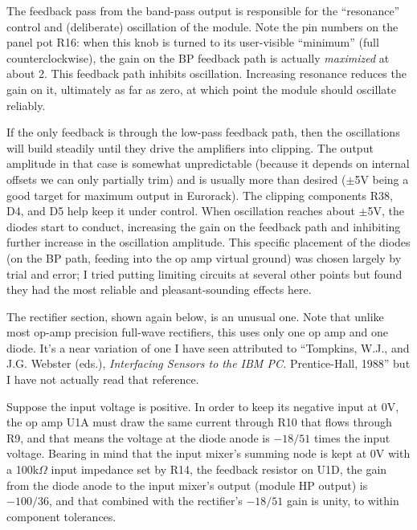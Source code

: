 The feedback pass from the band-pass output is responsible for the
``resonance'' control and (deliberate) oscillation of the module.  Note the
pin numbers on the panel pot R16: when this knob is turned to its
user-visible ``minimum'' (full counterclockwise), the gain on the BP
feedback path is actually \emph{maximized} at about 2.  This feedback path
inhibits oscillation.  Increasing resonance reduces the gain on it,
ultimately as far as zero, at which point the module should oscillate
reliably.

If the only feedback is through the low-pass feedback path, then the
oscillations will build steadily until they drive the amplifiers into
clipping.  The output amplitude in that case is somewhat unpredictable
(because it depends on internal offsets we can only partially trim) and is
usually more than desired ($\pm$5V being a good target for maximum output in
Eurorack).  The clipping components R38, D4, and D5 help keep it under
control.  When oscillation reaches about $\pm$5V, the diodes start to
conduct, increasing the gain on the feedback path and inhibiting further
increase in the oscillation amplitude.  This specific placement of the
diodes (on the BP path, feeding into the op amp virtual ground) was chosen
largely by trial and error; I tried putting limiting circuits at several
other points but found they had the most reliable and pleasant-sounding
effects here.

The rectifier section, shown again below, is an unusual one.  Note that
unlike most op-amp precision full-wave rectifiers, this uses only one op amp
and one diode.  It's a near variation of one I have seen attributed to
``Tompkins, W.J., and J.G.  Webster (eds.), \textit{Interfacing Sensors to
the IBM PC.} Prentice-Hall, 1988'' but I have not actually read that
reference.

\vspace{0.5\baselineskip}
{\centering\par}

Suppose the input voltage is positive.  In order to keep its negative input
at 0V, the op amp U1A must draw the same current through R10 that flows through
R9, and that means the voltage at the diode anode is $-18/51$ times the
input voltage.  Bearing in mind that the input mixer's summing node is kept
at 0V with a 100k$\Omega$ input impedance set by R14, the feedback resistor
on U1D, the gain from the diode anode to the input mixer's output (module HP
output) is $-100/36$, and that combined with the rectifier's $-18/51$ gain
is unity, to within component tolerances.


